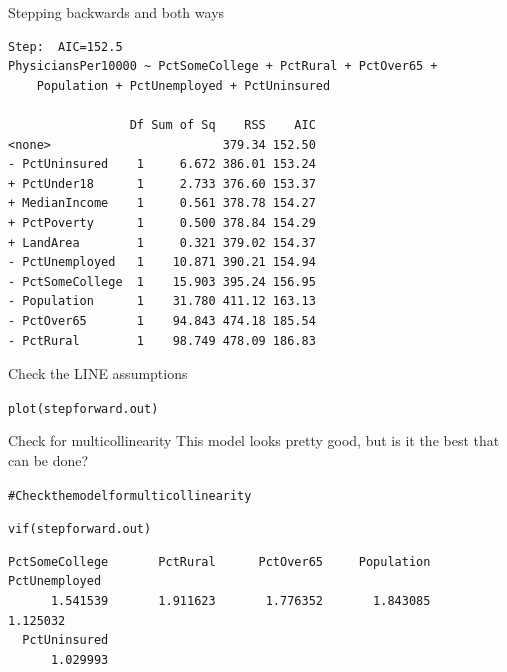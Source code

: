 \documentclass{beamer}\usepackage[]{graphicx}\usepackage[]{color}
\makeatletter
\newcommand{\hlcom}[1]{\textcolor[rgb]{0.824,0.706,0.549}{#1}}%
\newcommand{\hlstd}[1]{\textcolor[rgb]{1,0.894,0.769}{#1}}%
\newcommand{\hlkwd}[1]{\textcolor[rgb]{1,0.78,0.769}{#1}}%
\newenvironment{kframe}{%
 \def\at@end@of@kframe{}%
 \ifinner\ifhmode%
  \def\at@end@of@kframe{\end{minipage}}%
  \begin{minipage}{\columnwidth}%
 \fi\fi%
 \def\FrameCommand##1{\hskip\@totalleftmargin \hskip-\fboxsep
 \colorbox{shadecolor}{##1}\hskip-\fboxsep
     \hskip-\linewidth \hskip-\@totalleftmargin \hskip\columnwidth}%
 \MakeFramed {\advance\hsize-\width
   \@totalleftmargin\z@ \linewidth\hsize
   \@setminipage}}%
 {\par\unskip\endMakeFramed%
 \at@end@of@kframe}
\newenvironment{knitrout}{}{} %
\makeatother
\begin{document}
\begin{darkframes}
\begin{frame}[fragile]{Stepping backwards and both ways}
\begin{knitrout}
\begin{kframe}
\begin{verbatim}
Step:  AIC=152.5
PhysiciansPer10000 ~ PctSomeCollege + PctRural + PctOver65 + 
    Population + PctUnemployed + PctUninsured

                 Df Sum of Sq    RSS    AIC
<none>                        379.34 152.50
- PctUninsured    1     6.672 386.01 153.24
+ PctUnder18      1     2.733 376.60 153.37
+ MedianIncome    1     0.561 378.78 154.27
+ PctPoverty      1     0.500 378.84 154.29
+ LandArea        1     0.321 379.02 154.37
- PctUnemployed   1    10.871 390.21 154.94
- PctSomeCollege  1    15.903 395.24 156.95
- Population      1    31.780 411.12 163.13
- PctOver65       1    94.843 474.18 185.54
- PctRural        1    98.749 478.09 186.83
\end{verbatim}
\end{kframe}
\end{knitrout}

      \lc
    \end{frame}


    \begin{frame}[fragile]{Check the LINE assumptions}
      \fontsize{9}{9}\selectfont

\begin{knitrout}
\begin{kframe}
\begin{alltt}
\hlkwd{plot}\hlstd{(stepforward.out)}
\end{alltt}
\end{kframe}


\end{knitrout}

    \end{frame}


    \begin{frame}[fragile]{Check for multicollinearity}
     This model looks pretty good, but is it the best that can be done?

\begin{knitrout}
\begin{kframe}
\begin{alltt}
\hlcom{# Check the model for multicollinearity}

\hlkwd{vif}\hlstd{(stepforward.out)}
\end{alltt}
\begin{verbatim}
PctSomeCollege       PctRural      PctOver65     Population  PctUnemployed 
      1.541539       1.911623       1.776352       1.843085       1.125032 
  PctUninsured 
      1.029993 
\end{verbatim}
\end{kframe}
\end{knitrout}


\end{frame}
\end{darkframes}
\end{document}
